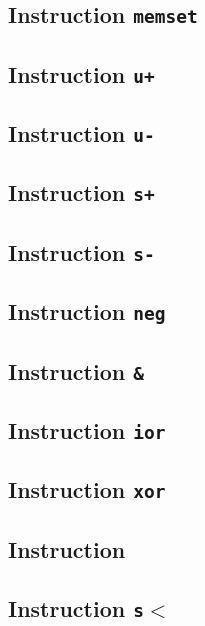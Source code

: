 \subsection{Instruction \texttt{memset}}

\subsection{Instruction \texttt{u+}}

\subsection{Instruction \texttt{u-}}

\subsection{Instruction \texttt{s+}}

\subsection{Instruction \texttt{s-}}

\subsection{Instruction \texttt{neg}}

\subsection{Instruction \texttt{\&}}

\subsection{Instruction \texttt{ior}}

\subsection{Instruction \texttt{xor}}

\subsection{Instruction \texttt{~}}

\subsection{Instruction \texttt{s$<$}}

